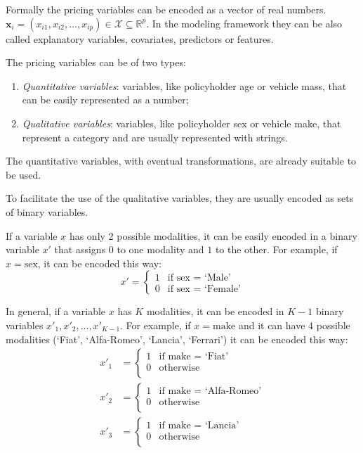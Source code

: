 \documentclass[a4paper, nobind]{templates/ociamthesis}
\providecommand{\tightlist}{%
  \setlength{\itemsep}{0pt}\setlength{\parskip}{0pt}}
\theoremstyle{definition}
\theoremstyle{definition}
\theoremstyle{definition}
\theoremstyle{remark}
\begin{document}
Formally the pricing variables can be encoded as a vector of real numbers. \(\boldsymbol{x}_i=(x_{i1}, x_{i2}, \dots, x_{ip})\in\mathcal{X}\subseteq\mathbb{R}^p\). In the modeling framework they can be also called explanatory variables, covariates, predictors or features.

The pricing variables can be of two types:

\begin{enumerate}
\def\labelenumi{\arabic{enumi}.}
\tightlist
\item
  \emph{Quantitative variables}: variables, like policyholder age or vehicle mass, that can be easily represented as a number;
\item
  \emph{Qualitative variables}: variables, like policyholder sex or vehicle make, that represent a category and are usually represented with strings.
\end{enumerate}

The quantitative variables, with eventual transformations, are already suitable to be used.

To facilitate the use of the qualitative variables, they are usually encoded as sets of binary variables.

If a variable \(x\) has only 2 possible modalities, it can be easily encoded in a binary variable \(x'\) that assigns \(0\) to one modality and \(1\) to the other. For example, if \(x = \text{sex}\), it can be encoded this way:
\[
x' = \begin{cases}
1 & \text{if } \text{sex } = \text{ `Male'} \\
0 & \text{if } \text{sex } = \text{ `Female'}
\end{cases}
\]

In general, if a variable \(x\) has \(K\) modalities, it can be encoded in \(K-1\) binary variables \(x'_1, x'_2, \dots, x'_{K-1}\). For example, if \(x = \text{make}\) and it can have 4 possible modalities (`Fiat', `Alfa-Romeo', `Lancia', `Ferrari') it can be encoded this way:
\begin{align*}
x'_1 & = \begin{cases}
1 & \text{if } \text{make } = \text{ `Fiat'} \\
0 & \text{otherwise} \\
\end{cases}
\\
x'_2 & = \begin{cases}
1 & \text{if } \text{make } = \text{ `Alfa-Romeo'} \\
0 & \text{otherwise} \\
\end{cases}
\\
x'_3 & = \begin{cases}
1 & \text{if } \text{make } = \text{ `Lancia'} \\
0 & \text{otherwise} \\
\end{cases}
\\
\end{align*}
\end{document}
